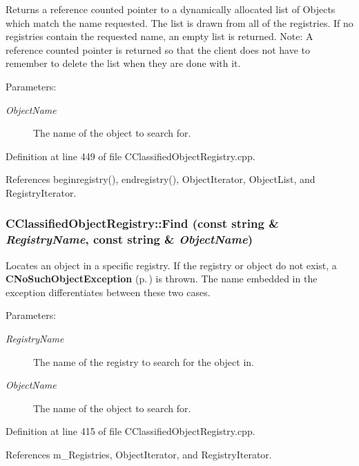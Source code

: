 Returns a reference counted pointer to a dynamically allocated list of Objects which match the name requested. The list is drawn from all of the registries. If no registries contain the requested name, an empty list is returned.  Note: A reference counted pointer is returned so that the client does not have to remember to delete the list when they are done with it.\begin{Desc}
\item[Parameters: ]\par
\begin{description}
\item[{\em 
Object\-Name}]The name of the object to search for. \end{description}
\end{Desc}


Definition at line 449 of file CClassified\-Object\-Registry.cpp.

References beginregistry(), endregistry(), Object\-Iterator, Object\-List, and Registry\-Iterator.
\subsubsection{ CClassified\-Object\-Registry::Find (const string \& {\em Registry\-Name}, const string \& {\em Object\-Name})}\label{classCClassifiedObjectRegistry_a7}


Locates an object in a specific registry. If the registry or object do not exist, a {\bf CNo\-Such\-Object\-Exception} {\rm (p.\,\pageref{classCNoSuchObjectException})} is thrown. The name embedded in the exception differentiates between these two cases.\begin{Desc}
\item[Parameters: ]\par
\begin{description}
\item[{\em 
Registry\-Name}]The name of the registry to search for the object in. \item[{\em 
Object\-Name}]The name of the object to search for. \end{description}
\end{Desc}


Definition at line 415 of file CClassified\-Object\-Registry.cpp.

References m\_\-Registries, Object\-Iterator, and Registry\-Iterator.
